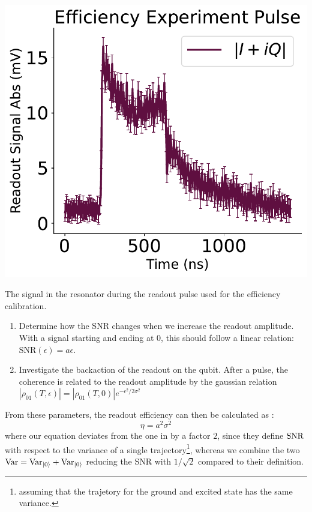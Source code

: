 \begin{marginfigure}
    \centering
    \includegraphics{Calibrations/Figures/Efficiency Experiment Pulse.pdf}
    \caption{The signal in the resonator during the readout pulse used for the efficiency calibration.}
    \label{fig:efficiency_pulse_shape}
\end{marginfigure}

\begin{enumerate}
    \item Determine how the SNR changes when we increase the readout amplitude. With a signal starting and ending at 0, this should follow a linear relation: $\text{SNR}(\epsilon) = a \epsilon$.
    \item Investigate the backaction of the readout on the qubit. After a pulse, the coherence is related to the readout amplitude by the gaussian relation $|\rho_{01}(T, \epsilon)| = |\rho_{01}(T, 0)|e^{-\epsilon^2/2\sigma^2}$
\end{enumerate}
From these parameters, the readout efficiency can then be calculated as \cite{bultink_general_2018}:
\begin{equation}
    \eta = a^2\sigma^2
\end{equation}
where our equation deviates from the one in \cite{bultink_general_2018} by a factor $2$, since they define $\operatorname{SNR}$ with respect to the variance of a single trajectory\footnote{assuming that the trajetory for the ground and excited state has the same variance.}, whereas we combine the two $\text{Var} = \text{Var}_{\ket{0}} + \text{Var}_{\ket{0}}$ reducing the SNR with $1/\sqrt{2}$ compared to their definition.

